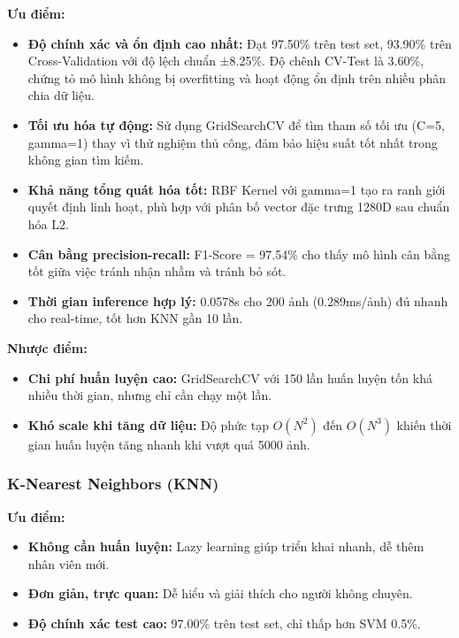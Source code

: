 \documentclass[a4paper]{book}
\begin{document}
\textbf{Ưu điểm:}
\begin{itemize}
    \item \textbf{Độ chính xác và ổn định cao nhất:} Đạt 97.50\% trên test set, 93.90\% trên Cross-Validation với độ lệch chuẩn  ±8.25\%. Độ chênh CV-Test là 3.60\%, chứng tỏ mô hình không bị overfitting và hoạt động ổn định trên nhiều phân chia dữ liệu.
    
    \item \textbf{Tối ưu hóa tự động:} Sử dụng GridSearchCV để tìm tham số tối ưu (C=5, gamma=1) thay vì thử nghiệm thủ công, đảm bảo hiệu suất tốt nhất trong không gian tìm kiếm.
    
    \item \textbf{Khả năng tổng quát hóa tốt:} RBF Kernel với gamma=1 tạo ra ranh giới quyết định linh hoạt, phù hợp với phân bố vector đặc trưng 1280D sau chuẩn hóa L2.
    
    \item \textbf{Cân bằng precision-recall:} F1-Score = 97.54\% cho thấy mô hình cân bằng tốt giữa việc tránh nhận nhầm và tránh bỏ sót.
    
    \item \textbf{Thời gian inference hợp lý:} 0.0578s cho 200 ảnh (0.289ms/ảnh) đủ nhanh cho real-time, tốt hơn KNN gần 10 lần.
\end{itemize}

\textbf{Nhược điểm:}
\begin{itemize}
    \item \textbf{Chi phí huấn luyện cao:} GridSearchCV với 150 lần huấn luyện tốn khá nhiều thời gian, nhưng chỉ cần chạy một lần.
    
    \item \textbf{Khó scale khi tăng dữ liệu:} Độ phức tạp $O(N^2)$ đến $O(N^3)$ khiến thời gian huấn luyện tăng nhanh khi vượt quá 5000 ảnh.
\end{itemize}

\subsubsection{K-Nearest Neighbors (KNN)}

\textbf{Ưu điểm:}
\begin{itemize}
    \item \textbf{Không cần huấn luyện:} Lazy learning giúp triển khai nhanh, dễ thêm nhân viên mới.
    
    \item \textbf{Đơn giản, trực quan:} Dễ hiểu và giải thích cho người không chuyên.
    
    \item \textbf{Độ chính xác test cao:} 97.00\% trên test set, chỉ thấp hơn SVM 0.5\%.
\end{itemize}
\end{document}
